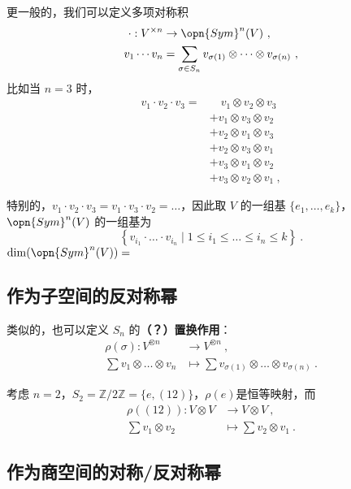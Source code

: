 更一般的，我们可以定义多项对称积
\begin{equation}
\begin{aligned}
\cdot: V^{\times n} &\to \opn{Sym}^n(V)~, \\
v_1 \cdots v_n &= \sum_{\sigma \in S_n} v_{\sigma(1)} \otimes \dots \otimes v_{\sigma(n)}~,
\end{aligned}
\end{equation}
比如当 $n = 3$ 时，
\begin{equation}
\begin{aligned}
v_1 \cdot v_2 \cdot v_3 = &\quad v_1 \otimes v_2 \otimes v_3 \\
&+ v_1 \otimes v_3 \otimes v_2 \\
&+ v_2 \otimes v_1 \otimes v_3 \\
&+ v_2 \otimes v_3 \otimes v_1 \\
&+ v_3 \otimes v_1 \otimes v_2 \\
&+ v_3 \otimes v_2 \otimes v_1~,
\end{aligned}
\end{equation}

特别的，$v_1 \cdot v_2 \cdot v_3 = v_1 \cdot v_3 \cdot v_2 = \dots$，因此取 $V$ 的一组基 $\{e_1, \dots, e_k\}$，$\opn{Sym}^n(V)$ 的一组基为
\begin{equation}
\left\{ v_{i_1} \cdot \dots \cdot v_{i_n} \mid 1 \leq i_1 \leq \dots \leq i_n \leq k \right\}~.
\end{equation}
$\dim(\opn{Sym}^n(V)) = $

\subsection{作为子空间的反对称幂}

类似的，也可以定义 $S_n$ 的\textbf{（？）置换作用}：
\begin{equation}
\begin{aligned}
\rho(\sigma): V^{\otimes n} &\to V^{\otimes n}~, \\
\sum v_1 \otimes \dots \otimes v_n &\mapsto \sum v_{\sigma(1)} \otimes \dots \otimes v_{\sigma(n)}~.
\end{aligned}
\end{equation}

\begin{example}{}
考虑 $n = 2$，$S_2 = \mathbb{Z}/2\mathbb{Z} = \{e, (1 2)\}$，$\rho(e)$是恒等映射，而
\begin{equation}
\begin{aligned}
\rho((1 2)): V \otimes V &\to V \otimes V~, \\
\sum v_1 \otimes v_2 &\mapsto \sum v_2 \otimes v_1~.
\end{aligned}
\end{equation}
\end{example}

\subsection{作为商空间的对称/反对称幂}